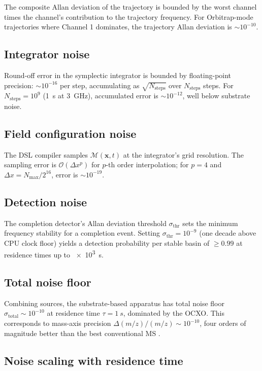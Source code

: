 \documentclass[twocolumn,11pt,a4paper]{article}
\theoremstyle{definition}
\theoremstyle{remark}
\newcommand{\Depth}{\mathcal{M}}
\begin{document}
The composite Allan deviation of the trajectory is bounded by the worst channel times the channel's contribution to the trajectory frequency. For Orbitrap-mode trajectories where Channel 1 dominates, the trajectory Allan deviation is $\sim 10^{-10}$.

\subsection{Integrator noise}

Round-off error in the symplectic integrator is bounded by floating-point precision: $\sim 10^{-16}$ per step, accumulating as $\sqrt{N_{\mathrm{steps}}}$ over $N_{\mathrm{steps}}$ steps. For $N_{\mathrm{steps}} = 10^9$ (\SI{1}{s} at \SI{3}{GHz}), accumulated error is $\sim 10^{-12}$, well below substrate noise.

\subsection{Field configuration noise}

The DSL compiler samples $\Depth(\mathbf{x},t)$ at the integrator's grid resolution. The sampling error is $\mathcal{O}(\Delta x^p)$ for $p$-th order interpolation; for $p = 4$ and $\Delta x = N_{\max}/2^{16}$, error is $\sim 10^{-19}$.

\subsection{Detection noise}

The completion detector's Allan deviation threshold $\sigma_{\mathrm{thr}}$ sets the minimum frequency stability for a completion event. Setting $\sigma_{\mathrm{thr}} = 10^{-9}$ (one decade above CPU clock floor) yields a detection probability per stable basin of $\ge 0.99$ at residence times up to \SI{e3}{s}.

\subsection{Total noise floor}

Combining sources, the substrate-based apparatus has total noise floor $\sigma_{\mathrm{total}} \sim 10^{-10}$ at residence time $\tau = \SI{1}{s}$, dominated by the OCXO. This corresponds to mass-axis precision $\Delta(m/z)/(m/z) \sim 10^{-10}$, four orders of magnitude better than the best conventional MS \citep{marshall2005}.

\subsection{Noise scaling with residence time}
\end{document}
